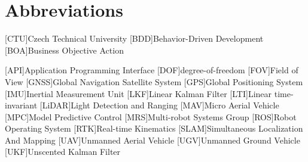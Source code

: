 \section*{Abbreviations}

\begin{acronym}
[CTU]{Czech Technical University}
[BDD]{Behavior-Driven Development}
[BOA]{Business Objective Action}


[API]{Application Programming Interface}
[DOF]{degree-of-freedom}
[FOV]{Field of View}
[GNSS]{Global Navigation Satellite System}
[GPS]{Global Positioning System}
[IMU]{Inertial Measurement Unit}
[LKF]{Linear Kalman Filter}
[LTI]{Linear time-invariant}
[LiDAR]{Light Detection and Ranging}
[MAV]{Micro Aerial Vehicle}
[MPC]{Model Predictive Control}
[MRS]{Multi-robot Systems Group}
[ROS]{Robot Operating System}
[RTK]{Real-time Kinematics}
[SLAM]{Simultaneous Localization And Mapping}
[UAV]{Unmanned Aerial Vehicle}
[UGV]{Unmanned Ground Vehicle}
[UKF]{Unscented Kalman Filter}

\end{acronym}

